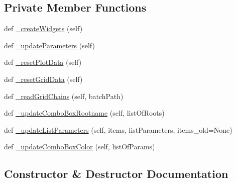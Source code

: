 \subsection*{Private Member Functions}
\begin{DoxyCompactItemize}
\item 
def \mbox{\hyperlink{classgetdist_1_1gui_1_1mainwindow_1_1MainWindow_ad50bd5655ef9bb4da792c72728a056fa}{\+\_\+create\+Widgets}} (self)
\item 
def \mbox{\hyperlink{classgetdist_1_1gui_1_1mainwindow_1_1MainWindow_a77a47206bb3e2ecb4dbac87af2f85f6e}{\+\_\+update\+Parameters}} (self)
\item 
def \mbox{\hyperlink{classgetdist_1_1gui_1_1mainwindow_1_1MainWindow_a3e7c9caefe4a820ec6d2f2d1cf7a41c8}{\+\_\+reset\+Plot\+Data}} (self)
\item 
def \mbox{\hyperlink{classgetdist_1_1gui_1_1mainwindow_1_1MainWindow_aa66e5484958005c6d6dfd988a05ac83a}{\+\_\+reset\+Grid\+Data}} (self)
\item 
def \mbox{\hyperlink{classgetdist_1_1gui_1_1mainwindow_1_1MainWindow_a8e87ee33947bf720fec739d5de9dd99c}{\+\_\+read\+Grid\+Chains}} (self, batch\+Path)
\item 
def \mbox{\hyperlink{classgetdist_1_1gui_1_1mainwindow_1_1MainWindow_a2577966dbd8821764a2880b0883cd0c6}{\+\_\+update\+Combo\+Box\+Rootname}} (self, list\+Of\+Roots)
\item 
def \mbox{\hyperlink{classgetdist_1_1gui_1_1mainwindow_1_1MainWindow_a4136dbf5a3f107c064a7b5a58c4dcdb7}{\+\_\+update\+List\+Parameters}} (self, items, list\+Parameters, items\+\_\+old=None)
\item 
def \mbox{\hyperlink{classgetdist_1_1gui_1_1mainwindow_1_1MainWindow_a70759462a72f7fb41af9c795b0318346}{\+\_\+update\+Combo\+Box\+Color}} (self, list\+Of\+Params)
\end{DoxyCompactItemize}


\subsection{Constructor \& Destructor Documentation}
\mbox{\label{classgetdist_1_1gui_1_1mainwindow_1_1MainWindow_ab182efaf585a11dbcf55b28e00010e98}} 
